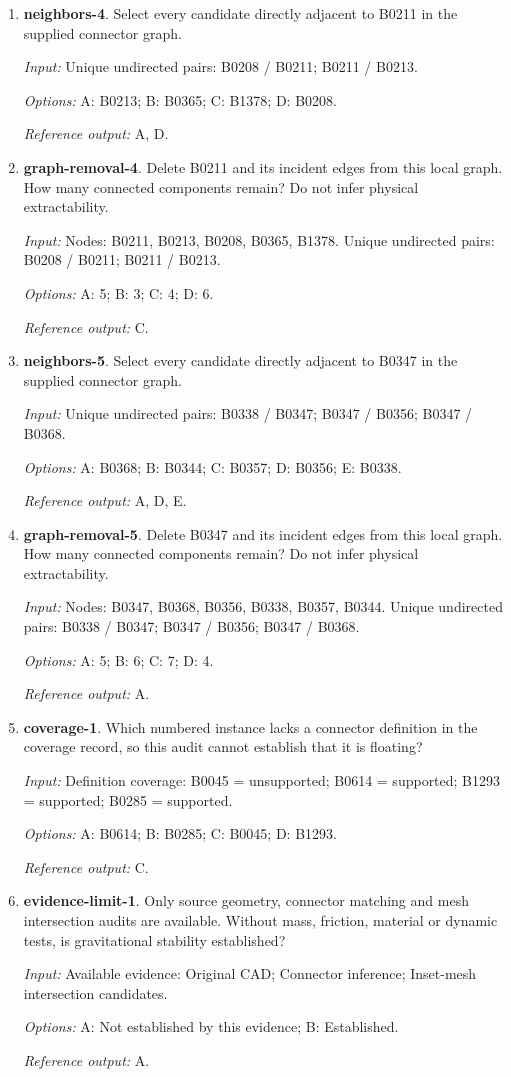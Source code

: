 \begin{enumerate}
\item \textbf{neighbors-4}. Select every candidate directly adjacent to B0211 in the supplied connector graph.\par {\small \textit{Input:} Unique undirected pairs: B0208 / B0211; B0211 / B0213. \par\textit{Options:} A: B0213; B: B0365; C: B1378; D: B0208. \par\textit{Reference output:} A, D.}
\item \textbf{graph-removal-4}. Delete B0211 and its incident edges from this local graph. How many connected components remain? Do not infer physical extractability.\par {\small \textit{Input:} Nodes: B0211, B0213, B0208, B0365, B1378. Unique undirected pairs: B0208 / B0211; B0211 / B0213. \par\textit{Options:} A: 5; B: 3; C: 4; D: 6. \par\textit{Reference output:} C.}
\item \textbf{neighbors-5}. Select every candidate directly adjacent to B0347 in the supplied connector graph.\par {\small \textit{Input:} Unique undirected pairs: B0338 / B0347; B0347 / B0356; B0347 / B0368. \par\textit{Options:} A: B0368; B: B0344; C: B0357; D: B0356; E: B0338. \par\textit{Reference output:} A, D, E.}
\item \textbf{graph-removal-5}. Delete B0347 and its incident edges from this local graph. How many connected components remain? Do not infer physical extractability.\par {\small \textit{Input:} Nodes: B0347, B0368, B0356, B0338, B0357, B0344. Unique undirected pairs: B0338 / B0347; B0347 / B0356; B0347 / B0368. \par\textit{Options:} A: 5; B: 6; C: 7; D: 4. \par\textit{Reference output:} A.}
\item \textbf{coverage-1}. Which numbered instance lacks a connector definition in the coverage record, so this audit cannot establish that it is floating?\par {\small \textit{Input:} Definition coverage: B0045 = unsupported; B0614 = supported; B1293 = supported; B0285 = supported. \par\textit{Options:} A: B0614; B: B0285; C: B0045; D: B1293. \par\textit{Reference output:} C.}
\item \textbf{evidence-limit-1}. Only source geometry, connector matching and mesh intersection audits are available. Without mass, friction, material or dynamic tests, is gravitational stability established?\par {\small \textit{Input:} Available evidence: Original CAD; Connector inference; Inset-mesh intersection candidates. \par\textit{Options:} A: Not established by this evidence; B: Established. \par\textit{Reference output:} A.}

\end{enumerate}
